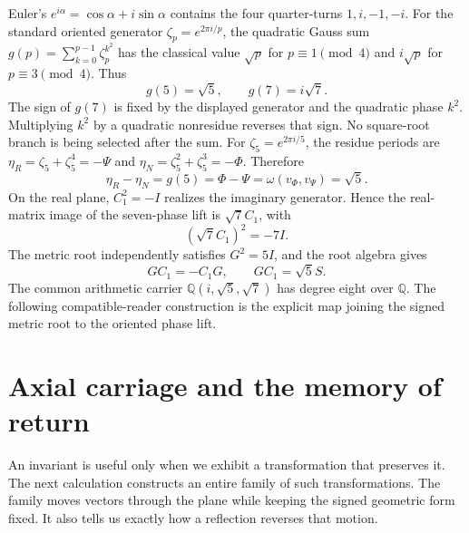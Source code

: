 \documentclass[10pt]{article}
\newcommand{\Q}{\mathbb Q}
\begin{document}
Euler's $e^{i\alpha}=\cos\alpha+i\sin\alpha$ contains the four quarter-turns $1,i,-1,-i$. For the standard oriented generator $\zeta_p=e^{2\pi i/p}$, the quadratic Gauss sum $g(p)=\sum_{k=0}^{p-1}\zeta_p^{k^2}$ has the classical value $\sqrt p$ for $p\equiv1\pmod4$ and $i\sqrt p$ for $p\equiv3\pmod4$. Thus
\begin{equation}
\boxed{g(5)=\sqrt5,\qquad g(7)=i\sqrt7.}
\end{equation}
The sign of $g(7)$ is fixed by the displayed generator and the quadratic phase $k^2$. Multiplying $k^2$ by a quadratic nonresidue reverses that sign. No square-root branch is being selected after the sum.
For $\zeta_5=e^{2\pi i/5}$, the residue periods are $\eta_R=\zeta_5+\zeta_5^4=-\Psi$ and $\eta_N=\zeta_5^2+\zeta_5^3=-\Phi$. Therefore
\begin{equation}\boxed{\eta_R-\eta_N=g(5)=\Phi-\Psi=\omega(v_\Phi,v_\Psi)=\sqrt5.}\end{equation}
On the real plane, $C_1^2=-I$ realizes the imaginary generator. Hence the real-matrix image of the seven-phase lift is $\sqrt7C_1$, with
\begin{equation}
(\sqrt7C_1)^2=-7I.
\end{equation}
The metric root independently satisfies $G^2=5I$, and the root algebra gives
\begin{equation}
GC_1=-C_1G,\qquad GC_1=\sqrt5S.
\end{equation}
The common arithmetic carrier $\Q(i,\sqrt5,\sqrt7)$ has degree eight over $\Q$. The following compatible-reader construction is the explicit map joining the signed metric root to the oriented phase lift.
\section{Axial carriage and the memory of return}\label{sec:axial}
An invariant is useful only when we exhibit a transformation that preserves it. The next calculation constructs an entire family of such transformations. The family moves vectors through the plane while keeping the signed geometric form fixed. It also tells us exactly how a reflection reverses that motion.
\end{document}
